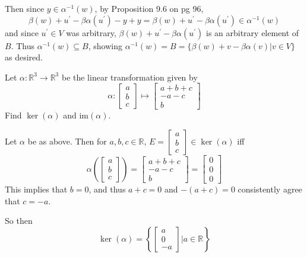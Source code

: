 \documentclass{article}
\begin{document}
\begin{solution}
Then since $y \in \alpha^{-1}(w)$, by Proposition 9.6 on pg 96,
\[
\beta(w) + u^{\prime} - \beta\alpha(u^{\prime}) -y +y = \beta(w) + u^{\prime} - \beta\alpha(u^{\prime}) \in \alpha^{-1}(w)
\]
and since $u^{\prime}\in V$ was arbitrary, $\beta(w) + u^{\prime} - \beta\alpha(u^{\prime})$ is an arbitrary element of $B$. Thus $\alpha^{-1}(w) \subseteq B$, showing  $\alpha^{-1}(w)= B =\{ \beta(w) +v -\beta\alpha(v) \vert v \in V \}$ as desired.

\end{solution}

\setcounter{problem}{268}
\begin{problem}
Let $\alpha:\mathbb{R}^{3}\to\mathbb{R}^{3}$ be the linear transformation given by
\[
\alpha:
\begin{bmatrix}
a\\ b\\ c
\end{bmatrix}
\mapsto
\begin{bmatrix}
a+b+c\\ -a-c\\ b
\end{bmatrix}
\]
Find $\ker(\alpha)$ and $\text{im}(\alpha)$.
\end{problem}

\renewcommand{\thesolution}{\theproblem.\alph{solution}}
\begin{solution}
Let $\alpha$ be as above. Then for $a,b,c \in \mathbb{R}$, $E = \begin{bmatrix}
a\\ b\\ c
\end{bmatrix} \in \ker(\alpha)$ iff
\[
\alpha\left(
\begin{bmatrix}
a\\ b\\ c
\end{bmatrix}
\right) =
\begin{bmatrix}
a+b+c\\ -a-c\\ b
\end{bmatrix} =
\begin{bmatrix}
0\\ 0\\ 0
\end{bmatrix}
\]
This implies that $b=0$, and thus $a+c=0$ and $-(a+c)=0$ consistently agree that $c=-a$.

So then
\[
\ker(\alpha) = \left\{
\begin{bmatrix}
a\\ 0\\ -a
\end{bmatrix}
\bigg|
a \in \mathbb{R}
\right\}
\]

\end{solution}
\end{document}
